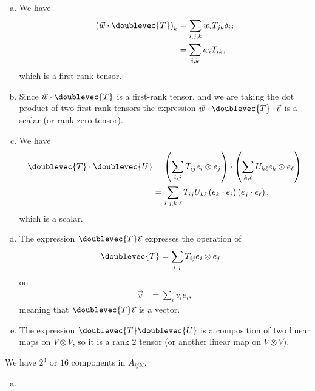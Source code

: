 \documentclass[10pt]{mypackage}
\begin{document}
\RaggedRight
\begin{solution}[29.5]\hfill
  \begin{enumerate}[(a)]
    \item We have
      \begin{align*}
        \left( \vec{w}\cdot \doublevec{T} \right)_{k} &= \sum_{i,j,k}w_{i}T_{jk}\delta_{ij}\\
                                   &= \sum_{i,k}w_iT_{ik},
      \end{align*}
      which is a first-rank tensor.
    \item Since $\vec{w}\cdot \doublevec{T}$ is a first-rank tensor, and we are taking the dot product of two first rank tensors the expression $\vec{w}\cdot \doublevec{T}\cdot \vec{v}$ is a scalar (or rank zero tensor).
    \item We have
      \begin{align*}
        \doublevec{T}\cdot \doublevec{U} &= \left( \sum_{i,j}T_{ij}e_i\otimes e_j \right)\cdot \left( \sum_{k,\ell}U_{k\ell} e_{k}\otimes e_{\ell} \right)\\
                                         &= \sum_{i,j,k,\ell}T_{ij}U_{k \ell} \left( e_k\cdot e_i \right)\left( e_j\cdot e_{\ell} \right),
      \end{align*}
      which is a scalar.
    \item The expression $\doublevec{T}\vec{v}$ expresses the operation of
      \begin{align*}
        \doublevec{T} &= \sum_{i,j}T_{ij}e_i\otimes e_j
      \end{align*}
      on
      \begin{align*}
        \vec{v} &= \sum_{i}v_ie_i,
      \end{align*}
      meaning that $\doublevec{T}\vec{v}$ is a vector.
    \item The expression $\doublevec{T}\doublevec{U}$ is a composition of two linear maps on $V\otimes V$, so it is a rank $2$ tensor (or another linear map on $V\otimes V$).
  \end{enumerate}
\end{solution}
\begin{solution}[29.7]
  We have $2^{4}$ or $16$ components in $A_{ijkl}$.
\end{solution}
\begin{solution}[29.10]
  
\end{solution}
\begin{solution}[29.11]\hfill
\end{solution}
\begin{enumerate}[(a)]
  \item 
\end{enumerate}
\begin{solution}[29.12]

\end{solution}
\begin{solution}[29.14]

\end{solution}
\begin{solution}[29.23]

\end{solution}
\begin{solution}[29.24]

\end{solution}
\begin{solution}[29.25]

\end{solution}
\end{document}
